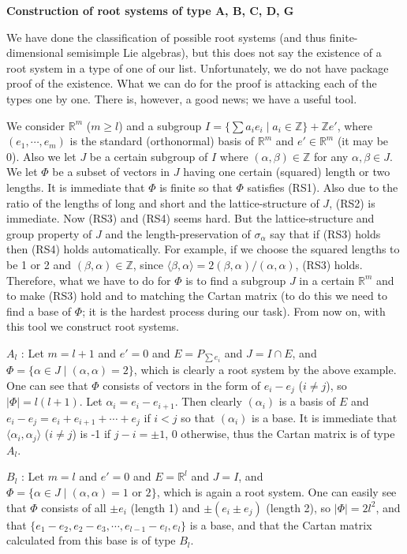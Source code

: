 \documentclass{article}
\newcommand{\InZ}{\mathbb{Z}}
\newcommand{\ReR}{\mathbb{R}}
\newcommand{\SBar}{\;|\;}
\begin{document}
\newpage

\textbf{Construction of root systems of type A, B, C, D, G}

We have done the classification of possible root systems (and thus finite-dimensional semisimple Lie algebras), but this does not say the existence of a root system in a type of one of our list.
Unfortunately, we do not have package proof of the existence.
What we can do for the proof is attacking each of the types one by one.
There is, however, a good news; we have a useful tool.

We consider $\ReR^m$ ($m \ge l$) and a subgroup $I = \{\sum a_i e_i \SBar a_i \in \InZ\} + \InZ e'$, where $(e_1, \cdots, e_m)$ is the standard (orthonormal) basis of $\ReR^m$ and $e' \in \ReR^m$ (it may be 0).
Also we let $J$ be a certain subgroup of $I$ where $(\alpha, \beta) \in \InZ$ for any $\alpha, \beta \in J$.
We let $\Phi$ be a subset of vectors in $J$ having one certain (squared) length or two lengths.
It is immediate that $\Phi$ is finite so that $\Phi$ satisfies (RS1).
Also due to the ratio of the lengths of long and short and the lattice-structure of $J$, (RS2) is immediate.
Now (RS3) and (RS4) seems hard.
But the lattice-structure and group property of $J$ and the length-preservation of $\sigma_\alpha$ say that if (RS3) holds then (RS4) holds automatically.
For example, if we choose the squared lengths to be 1 or 2 and $(\beta, \alpha) \in \InZ$, since $\langle \beta, \alpha \rangle = 2(\beta, \alpha)/(\alpha, \alpha)$, (RS3) holds.
Therefore, what we have to do for $\Phi$ is to find a subgroup $J$ in a certain $\ReR^m$ and to make (RS3) hold and to matching the Cartan matrix (to do this we need to find a base of $\Phi$; it is the hardest process during our task).
From now on, with this tool we construct root systems.

$A_l$ : Let $m = l + 1$ and $e' = 0$ and $E = P_{\sum e_i}$ and $J = I \cap E$, and $\Phi = \{\alpha \in J \SBar (\alpha, \alpha) = 2\}$, which is clearly a root system by the above example.
One can see that $\Phi$ consists of vectors in the form of $e_i - e_j$ ($i \ne j$), so $|\Phi| = l(l + 1)$.
Let $\alpha_i = e_i - e_{i + 1}$.
Then clearly $(\alpha_i)$ is a basis of $E$ and $e_i - e_j = e_i + e_{i + 1} + \cdots + e_j$ if $i < j$ so that $(\alpha_i)$ is a base.
It is immediate that $\langle \alpha_i, \alpha_j \rangle$ ($i \ne j$) is -1 if $j - i = \pm 1$, 0 otherwise, thus the Cartan matrix is of type $A_l$.

$B_l$ : Let $m = l$ and $e' = 0$ and $E = \ReR^l$ and $J = I$, and $\Phi = \{\alpha \in J \SBar (\alpha, \alpha) = \textrm{1 or 2}\}$, which is again a root system.
One can easily see that $\Phi$ consists of all $\pm e_i$ (length 1) and $\pm(e_i \pm e_j)$ (length 2), so $|\Phi| = 2l^2$, and that $\{e_1 - e_2, e_2 - e_3, \cdots, e_{l - 1} - e_l, e_l\}$ is a base, and that the Cartan matrix calculated from this base is of type $B_l$.
\end{document}
